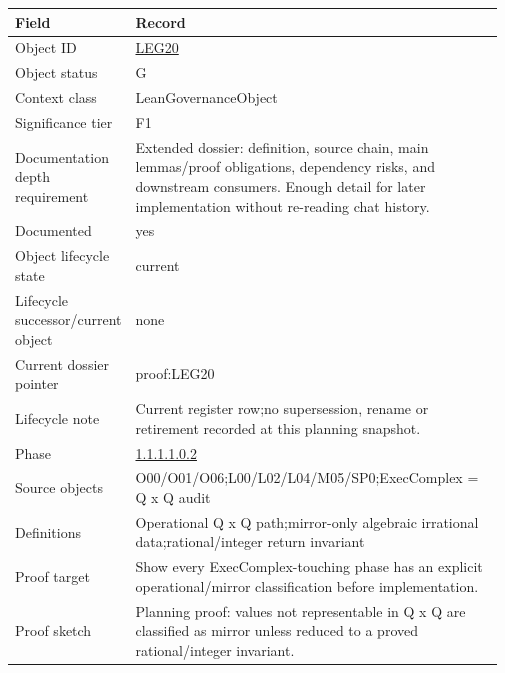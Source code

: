 \begin{longtable}{L{0.16\linewidth} L{0.81\linewidth}}
\hline
\textbf{Field} & \textbf{Record}\\
\hline
Object ID & \hyperlink{object-row-LEG20}{LEG20}\\
\hline\addlinespace[0.20em]
Object status & G\\
\hline\addlinespace[0.20em]
Context class & LeanGovernanceObject\\
\hline\addlinespace[0.20em]
Significance tier & F1\\
\hline\addlinespace[0.20em]
Documentation depth requirement & Extended dossier: definition, source chain, main lemmas/\allowbreak{}proof obligations, dependency risks, and downstream consumers. Enough detail for later implementation without re-reading chat history.\\
\hline\addlinespace[0.20em]
Documented & yes\\
\hline\addlinespace[0.20em]
Object lifecycle state & current\\
\hline\addlinespace[0.20em]
Lifecycle successor/\allowbreak{}current object & none\\
\hline\addlinespace[0.20em]
Current dossier pointer & proof:LEG20\\
\hline\addlinespace[0.20em]
Lifecycle note & Current register row;\newline no supersession, rename or retirement recorded at this planning snapshot.\\
\hline\addlinespace[0.20em]
Phase & \hyperlink{phase-row-1-1-1-1-0-2}{1.1.1.1.0.2}\\
\hline\addlinespace[0.20em]
Source objects & O00/\allowbreak{}O01/\allowbreak{}O06;\newline L00/\allowbreak{}L02/\allowbreak{}L04/\allowbreak{}M05/\allowbreak{}SP0;\newline ExecComplex = Q x Q audit\\
\hline\addlinespace[0.20em]
Definitions & Operational Q x Q path;\newline mirror-only algebraic irrational data;\newline rational/\allowbreak{}integer return invariant\\
\hline\addlinespace[0.20em]
Proof target & Show every ExecComplex-touching phase has an explicit operational/\allowbreak{}mirror classification before implementation.\\
\hline\addlinespace[0.20em]
Proof sketch & Planning proof: values not representable in Q x Q are classified as mirror unless reduced to a proved rational/\allowbreak{}integer invariant.\\

\end{longtable}
